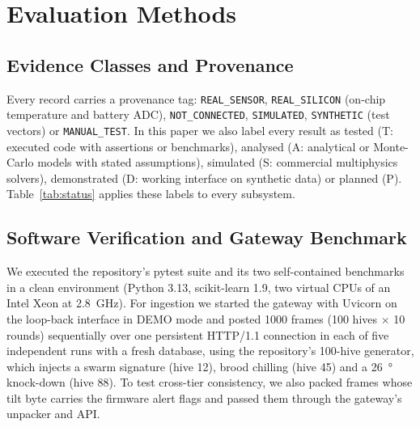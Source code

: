 \documentclass[conference]{IEEEtran}
\newcommand{\evT}{\textsf{T}}  %
\newcommand{\evA}{\textsf{A}}  %
\newcommand{\evS}{\textsf{S}}  %
\newcommand{\evP}{\textsf{P}}  %
\newcommand{\evD}{\textsf{D}}  %
\begin{document}
\section{Evaluation Methods}\label{sec:methods}
\subsection{Evidence Classes and Provenance}\label{sec:m-evidence}
Every record carries a provenance tag: \texttt{REAL\_SENSOR}, \texttt{REAL\_SILICON} (on-chip temperature and battery ADC), \texttt{NOT\_CONNECTED}, \texttt{SIMULATED}, \texttt{SYNTHETIC} (test vectors) or \texttt{MANUAL\_TEST}. In this paper we also label every result as tested (\evT: executed code with assertions or benchmarks), analysed (\evA: analytical or Monte-Carlo models with stated assumptions), simulated (\evS: commercial multiphysics solvers), demonstrated (\evD: working interface on synthetic data) or planned (\evP). Table~\ref{tab:status} applies these labels to every subsystem.

\subsection{Software Verification and Gateway Benchmark}\label{sec:m-sw}
We executed the repository's pytest suite and its two self-contained benchmarks in a clean environment (Python 3.13, scikit-learn 1.9, two virtual CPUs of an Intel Xeon at \SI{2.8}{GHz}). For ingestion we started the gateway with Uvicorn on the loop-back interface in DEMO mode and posted 1000 frames (100 hives $\times$ 10 rounds) sequentially over one persistent HTTP/1.1 connection in each of five independent runs with a fresh database, using the repository's 100-hive generator, which injects a swarm signature (hive 12), brood chilling (hive 45) and a \SI{26}{\degree} knock-down (hive 88). To test cross-tier consistency, we also packed frames whose tilt byte carries the firmware alert flags and passed them through the gateway's unpacker and API.
\end{document}
